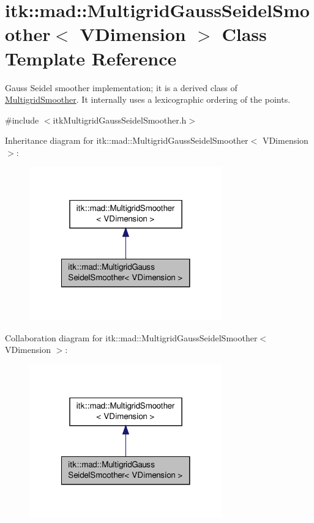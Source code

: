 \hypertarget{classitk_1_1mad_1_1_multigrid_gauss_seidel_smoother}{\section{itk\-:\-:mad\-:\-:Multigrid\-Gauss\-Seidel\-Smoother$<$ V\-Dimension $>$ Class Template Reference}
\label{classitk_1_1mad_1_1_multigrid_gauss_seidel_smoother}
}


Gauss Seidel smoother implementation; it is a derived class of \hyperlink{classitk_1_1mad_1_1_multigrid_smoother}{Multigrid\-Smoother}. It internally uses a lexicographic ordering of the points.  




{\ttfamily \#include $<$itk\-Multigrid\-Gauss\-Seidel\-Smoother.\-h$>$}



Inheritance diagram for itk\-:\-:mad\-:\-:Multigrid\-Gauss\-Seidel\-Smoother$<$ V\-Dimension $>$\-:
\nopagebreak
\begin{figure}[H]
\begin{center}
\leavevmode
\includegraphics[width=236pt]{classitk_1_1mad_1_1_multigrid_gauss_seidel_smoother__inherit__graph}
\end{center}
\end{figure}


Collaboration diagram for itk\-:\-:mad\-:\-:Multigrid\-Gauss\-Seidel\-Smoother$<$ V\-Dimension $>$\-:
\nopagebreak
\begin{figure}[H]
\begin{center}
\leavevmode
\includegraphics[width=236pt]{classitk_1_1mad_1_1_multigrid_gauss_seidel_smoother__coll__graph}
\end{center}
\end{figure}
